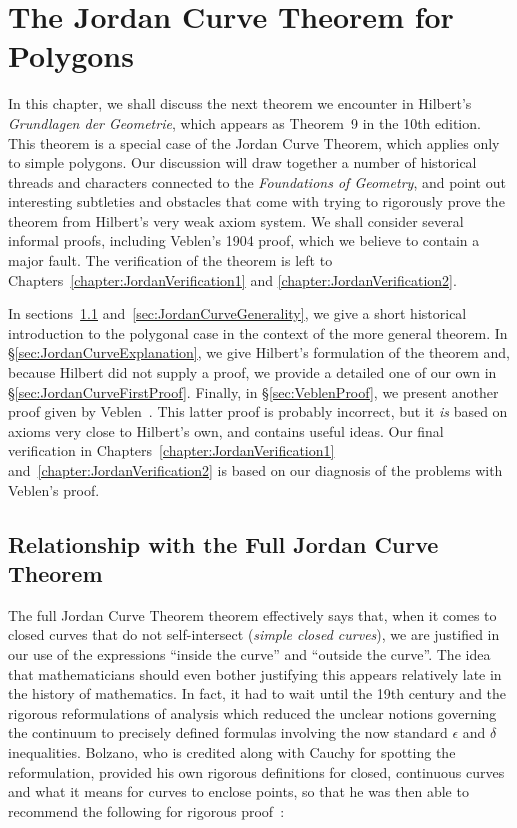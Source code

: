 \chapter{The Jordan Curve Theorem for Polygons}\label{chapter:JordanInformal}
In this chapter, we shall discuss the next theorem we encounter in Hilbert's \emph{Grundlagen der Geometrie}, which appears as Theorem~9 in the 10th edition. This theorem is a special case of the Jordan Curve Theorem, which applies only to simple polygons. Our discussion will draw together a number of historical threads and characters connected to the \emph{Foundations of Geometry}, and point out interesting subtleties and obstacles that come with trying to rigorously prove the theorem from Hilbert's very weak axiom system. We shall consider several informal proofs, including Veblen's 1904 proof, which we believe to contain a major fault. The verification of the theorem is left to Chapters~\ref{chapter:JordanVerification1} and \ref{chapter:JordanVerification2}.

In sections~\ref{sec:JordanCurveHistory} and~\ref{sec:JordanCurveGenerality}, we give a short historical introduction to the polygonal case in the context of the more general theorem. In \S\ref{sec:JordanCurveExplanation}, we give Hilbert's formulation of the theorem and, because Hilbert did not supply a proof, we provide a detailed one of our own in \S\ref{sec:JordanCurveFirstProof}. Finally, in \S\ref{sec:VeblenProof}, we present another proof given by Veblen~\cite{Veblenphd}. This latter proof is probably incorrect, but it \emph{is} based on axioms very close to Hilbert's own, and contains useful ideas. Our final verification in Chapters~\ref{chapter:JordanVerification1} and~\ref{chapter:JordanVerification2} is based on our diagnosis of the problems with Veblen's proof.

\section{Relationship with the Full Jordan Curve Theorem}\label{sec:JordanCurveHistory}
The full Jordan Curve Theorem theorem effectively says that, when it comes to closed curves that do not self-intersect (\emph{simple closed curves}), we are justified in our use of the expressions ``inside the curve'' and ``outside the curve''. The idea that mathematicians should even bother justifying this appears relatively late in the history of mathematics. In fact, it had to wait until the 19th century and the rigorous reformulations of analysis which reduced the unclear notions governing the continuum to precisely defined formulas involving the now standard $\epsilon$ and $\delta$ inequalities. Bolzano, who is credited along with Cauchy for spotting the reformulation, provided his own rigorous definitions for closed, continuous curves and what it means for curves to enclose points, so that he was then able to recommend the following for rigorous proof~\cite{BolzanoJordan}:

